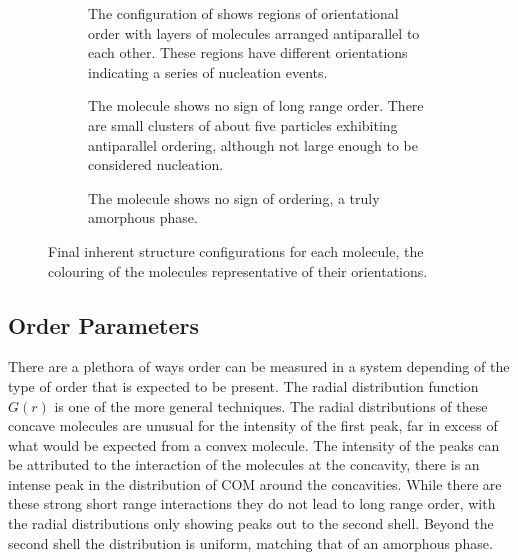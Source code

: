 \begin{figure}
    \centering
    \begin{subfigure}{0.45\linewidth}
        \caption{The configuration of \sone shows regions of orientational order with layers of molecules arranged antiparallel to each other. These regions have different orientations indicating a series of nucleation events.}
        \label{fig:sone inherent}
    \end{subfigure}
    \begin{subfigure}{0.45\linewidth}%
        \caption{The \scon molecule shows no sign of long range order. There are small clusters of about five particles exhibiting antiparallel ordering, although not large enough to be considered nucleation.}
        \label{fig:scon inherent}
    \end{subfigure}
    \begin{subfigure}{0.45\linewidth}
        \caption{The \tri molecule shows no sign of ordering, a truly amorphous phase.}
        \label{fig:scon inherent}
    \end{subfigure}
    \caption{Final inherent structure configurations for each molecule, the colouring of the molecules representative of their orientations.}
    \label{fig:inherent structures frame}
\end{figure}

\subsection{Order Parameters}

There are a plethora of ways order can be measured in a system depending of the type of order that is expected to be present. The radial distribution function $G(r)$ is one of the more general techniques. The radial distributions  of these concave molecules are unusual for the intensity of the first peak, far in excess of what would be expected from a convex molecule. The intensity of the peaks can be attributed to the interaction of the molecules at the concavity, there is an intense peak in the distribution of COM  around the concavities. While there are these strong short range interactions they do not lead to long range order, with the radial distributions only showing peaks out to the second shell. Beyond the second shell the distribution is uniform, matching that of an amorphous phase.

